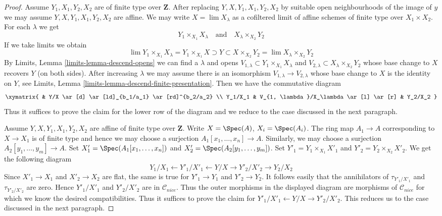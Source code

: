 \begin{proof}
\medskip\noindent
Assume $Y_1, X_1, Y_2, X_2$ are of finite type over $\mathbf{Z}$.
After replacing $Y, X, Y_1, X_1, Y_2, X_2$ by suitable open neighbourhoods
of the image of $y$ we may assume $Y, X, Y_1, X_1, Y_2, X_2$ are affine.
We may write $X = \lim X_\lambda$ as a cofiltered limit of affine
schemes of finite type over $X_1 \times X_2$. For each $\lambda$
we get
$$
Y_1 \times_{X_1} X_\lambda
\quad\text{and}\quad
X_\lambda \times_{X_2} Y_2
$$
If we take limits we obtain
$$
\lim Y_1 \times_{X_1} X_\lambda =
Y_1 \times_{X_1} X \supset Y \subset
X \times_{X_2} Y_2 = \lim X_\lambda \times_{X_2} Y_2
$$
By Limits, Lemma \ref{limits-lemma-descend-opens}
we can find a $\lambda$ and opens
$V_{1, \lambda} \subset Y_1 \times_{X_1} X_\lambda$ and
$V_{2, \lambda} \subset X_\lambda \times_{X_2} Y_2$
whose base change to $X$ recovers $Y$ (on both sides).
After increasing $\lambda$ we may assume
there is an isomorphism
$V_{1, \lambda} \to V_{2, \lambda}$ whose base change to $X$ is the
identity on $Y$, see
Limits, Lemma \ref{limits-lemma-descend-finite-presentation}.
Then we have the commutative diagram
$$
\xymatrix{
& Y/X \ar[d] \ar[ld]_{b_1/a_1} \ar[rd]^{b_2/a_2} \\
Y_1/X_1 & V_{1, \lambda}/X_\lambda \ar[l] \ar[r] & Y_2/X_2
}
$$
Thus it suffices to prove the claim for the lower row
of the diagram and we reduce to the case discussed in the
next paragraph.

\medskip\noindent
Assume $Y, X, Y_1, X_1, Y_2, X_2$ are affine of finite type over $\mathbf{Z}$.
Write $X = \Spec(A)$, $X_i = \Spec(A_i)$. The ring map $A_1 \to A$ corresponding
to $X \to X_1$ is of finite type and hence we may choose a surjection
$A_1[x_1, \ldots, x_n] \to A$. Similarly, we may choose a surjection
$A_2[y_1, \ldots, y_m] \to A$. Set $X'_1 = \Spec(A_1[x_1, \ldots, x_n])$
and $X'_2 = \Spec(A_2[y_1, \ldots, y_m])$.
Set $Y'_1 = Y_1 \times_{X_1} X'_1$ and $Y'_2 = Y_2 \times_{X_2} X'_2$.
We get the following diagram
$$
Y_1/X_1 \leftarrow
Y'_1/X'_1 \leftarrow
Y/X
\rightarrow Y'_2/X'_2
\rightarrow Y_2/X_2
$$
Since $X'_1 \to X_1$ and $X'_2 \to X_2$ are flat, the same is true
for $Y'_1 \to Y_1$ and $Y'_2 \to Y_2$. It follows easily that the
annihilators of $\tau_{Y'_1/X'_1}$ and $\tau_{Y'_2/X'_2}$ are zero.
Hence $Y'_1/X'_1$ and $Y'_2/X'_2$ are in $\mathcal{C}_{nice}$.
Thus the outer morphisms in the displayed diagram are morphisms
of $\mathcal{C}_{nice}$ for which we know the desired compatibilities.
Thus it suffices to prove the claim for
$Y'_1/X'_1 \leftarrow Y/X \rightarrow Y'_2/X'_2$. This reduces us
to the case discussed in the next paragraph.


\end{proof}
